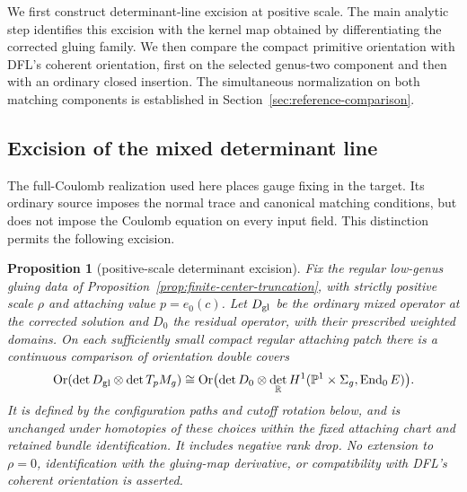 \documentclass[11pt]{amsart}
\newtheorem{proposition}[theorem]{Proposition}
\theoremstyle{definition}
\theoremstyle{remark}
\theoremstyle{plain}
\begin{document}
We first construct determinant-line excision at positive scale.
The main analytic step identifies this excision with the kernel
map obtained by differentiating the corrected gluing family.
We then compare the compact primitive orientation with DFL's
coherent orientation, first on the selected genus-two component
and then with an ordinary closed insertion. The simultaneous
normalization on both matching components is established in
Section~\ref{sec:reference-comparison}.

\subsection{Excision of the mixed determinant line}
\label{sec:actual-determinant-excision}

The full-Coulomb realization used here places gauge fixing in the
target. Its ordinary source imposes the normal trace and canonical
matching conditions, but does not impose the Coulomb equation on
every input field. This distinction permits the following excision.

\begin{proposition}[positive-scale determinant excision]
\label{prop:actual-determinant-excision}
Fix the regular low-genus gluing data of
Proposition~\ref{prop:finite-center-truncation}, with strictly positive
scale $\rho$ and attaching value $p=e_0(c)$. Let $D_{\rm gl}$ be
the ordinary mixed operator at the corrected solution and $D_0$
the residual operator, with their prescribed weighted domains.
On each sufficiently small compact regular attaching patch there is a continuous
comparison of orientation double covers
\begin{equation}\label{eq:actual-determinant-excision}
 \operatorname{Or}(\det D_{\rm gl}\otimes\det T_pM_g)
 \cong
 \operatorname{Or}\bigl(\det D_0\otimes
   \det_{\mathbb R}H^1(\mathbb P^1\times\Sigma_g,\operatorname{End}_0E)
                 \bigr).
\end{equation}
It is defined by the configuration paths and cutoff rotation below,
and is unchanged under homotopies of these choices within the fixed
attaching chart and retained bundle identification. It includes
negative rank drop. No extension to $\rho=0$, identification with
the gluing-map derivative, or compatibility with DFL's coherent
orientation is asserted.
\end{proposition}
\end{document}
